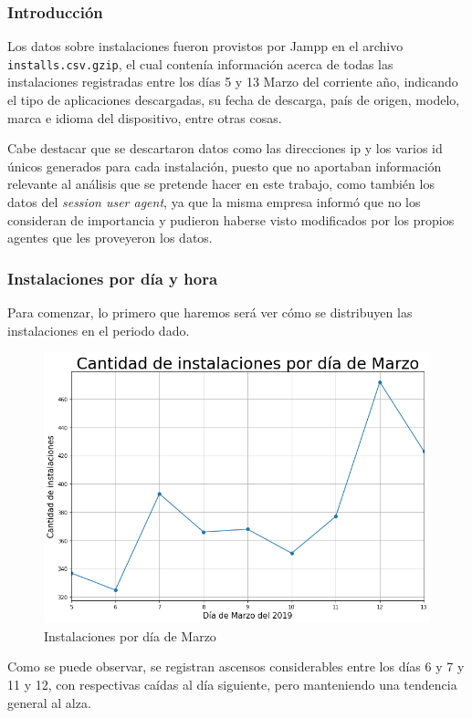 \documentclass[a4paper, 12pt]{article}
\begin{document}
	\subsubsection{Introducción}
		Los datos sobre instalaciones fueron provistos por Jampp en el archivo \texttt{installs.csv.gzip}, el cual contenía información acerca de todas las instalaciones registradas entre los días 5 y 13  Marzo del corriente año, indicando el tipo de aplicaciones descargadas, su fecha de descarga, país de origen, modelo, marca e idioma del dispositivo, entre otras cosas.

		Cabe destacar que se descartaron datos como las direcciones ip y los varios id únicos generados para cada instalación, puesto que no aportaban información relevante al análisis que se pretende hacer en este trabajo, como también los datos del \textit{session user agent}, ya que la misma empresa informó que no los consideran de importancia y pudieron haberse visto modificados por los propios agentes que les proveyeron los datos.

	\subsubsection{Instalaciones por día y hora}
		Para comenzar, lo primero que haremos será ver cómo se distribuyen las instalaciones en el periodo dado.
		\FloatBarrier
		\begin{figure}[h]
			\centering
			\includegraphics[width=\textwidth]{images/installs/installspordia.png}
			\caption{Instalaciones por día de Marzo}
		\end{figure}
		\FloatBarrier

		Como se puede observar, se registran ascensos considerables entre los días 6 y 7 y 11 y 12, con respectivas caídas al día siguiente, pero manteniendo una tendencia general al alza.
\end{document}
